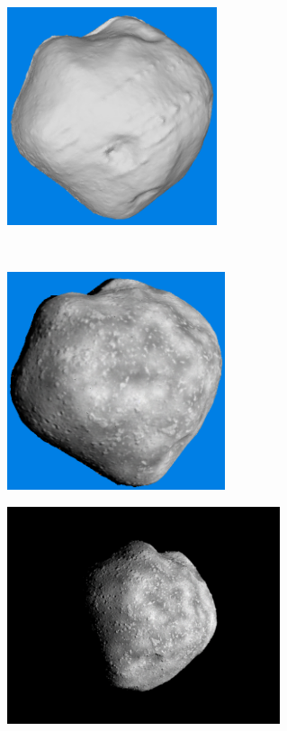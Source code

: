\begin{figure}[htb]
\begin{subfigure}[b]{0.46\textwidth}
        \caption{}
        \label{fig:recon_step_mesh}
    \end{subfigure}
    \begin{subfigure}[b]{0.46\textwidth}
        \centering
        \includegraphics[width=\textwidth,height=6.4cm]{doc/thesis/0_figures/models_quality/100_1/120_100_1_refine2.png}
        \caption{}
        \label{fig:recon_step_refine}
    \end{subfigure}
    \\
    \begin{subfigure}[b]{0.46\textwidth}
        \centering
        \includegraphics[width=\textwidth,height=6.4cm]{doc/thesis/0_figures/models_quality/100_1/120_100_1_texture1.png}
        \caption{}
        \label{fig:recon_step_texture}
    \end{subfigure}
    \begin{subfigure}[b]{0.46\textwidth}
        \centering
        \includegraphics[width=\textwidth,height=6.4cm]{doc/thesis/0_figures/models_quality/100_1/120_100_1_img1.png}

\end{subfigure}
\end{figure}
